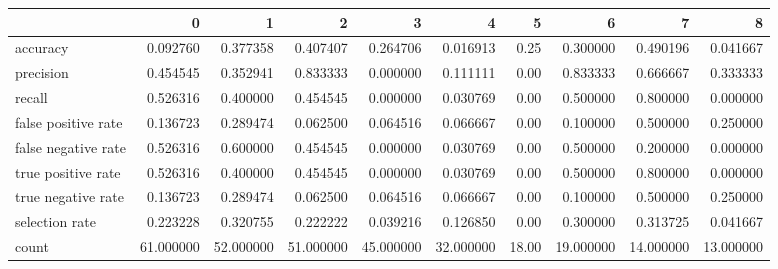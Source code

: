 \begin{tabular}{lrrrrrrrrr}
\toprule
{} &          0 &          1 &          2 &          3 &          4 &      5 &          6 &          7 &          8 \\
\midrule
accuracy            &   0.092760 &   0.377358 &   0.407407 &   0.264706 &   0.016913 &   0.25 &   0.300000 &   0.490196 &   0.041667 \\
precision           &   0.454545 &   0.352941 &   0.833333 &   0.000000 &   0.111111 &   0.00 &   0.833333 &   0.666667 &   0.333333 \\
recall              &   0.526316 &   0.400000 &   0.454545 &   0.000000 &   0.030769 &   0.00 &   0.500000 &   0.800000 &   0.000000 \\
false positive rate &   0.136723 &   0.289474 &   0.062500 &   0.064516 &   0.066667 &   0.00 &   0.100000 &   0.500000 &   0.250000 \\
false negative rate &   0.526316 &   0.600000 &   0.454545 &   0.000000 &   0.030769 &   0.00 &   0.500000 &   0.200000 &   0.000000 \\
true positive rate  &   0.526316 &   0.400000 &   0.454545 &   0.000000 &   0.030769 &   0.00 &   0.500000 &   0.800000 &   0.000000 \\
true negative rate  &   0.136723 &   0.289474 &   0.062500 &   0.064516 &   0.066667 &   0.00 &   0.100000 &   0.500000 &   0.250000 \\
selection rate      &   0.223228 &   0.320755 &   0.222222 &   0.039216 &   0.126850 &   0.00 &   0.300000 &   0.313725 &   0.041667 \\
count               &  61.000000 &  52.000000 &  51.000000 &  45.000000 &  32.000000 &  18.00 &  19.000000 &  14.000000 &  13.000000 \\
\bottomrule
\end{tabular}
